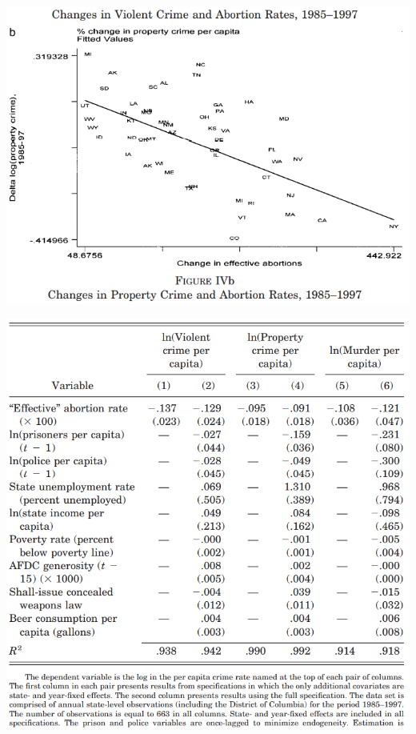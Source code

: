 \begin{frame}
    \vspace{-10pt}
    \begin{center}
    \includegraphics[height=0.85\textheight]{./resources/QJELevittScatter}
    \end{center}
\end{frame}

\begin{frame}
    \vspace{-10pt}
    \begin{center}
    \includegraphics[height=0.85\textheight]{./resources/QJELevittTable}
    \end{center}
\end{frame}

